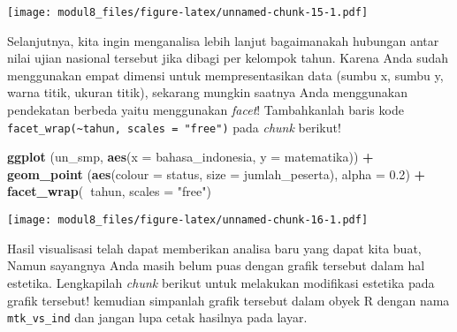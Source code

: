 \documentclass[
]{article}
\newenvironment{Shaded}{\begin{snugshade}}{\end{snugshade}}
\newcommand{\DataTypeTok}[1]{\textcolor[rgb]{0.13,0.29,0.53}{#1}}
\newcommand{\FloatTok}[1]{\textcolor[rgb]{0.00,0.00,0.81}{#1}}
\newcommand{\KeywordTok}[1]{\textcolor[rgb]{0.13,0.29,0.53}{\textbf{#1}}}
\newcommand{\NormalTok}[1]{#1}
\newcommand{\OperatorTok}[1]{\textcolor[rgb]{0.81,0.36,0.00}{\textbf{#1}}}
\newcommand{\StringTok}[1]{\textcolor[rgb]{0.31,0.60,0.02}{#1}}
\begin{document}
\texttt{[image: modul8\_files/figure-latex/unnamed-chunk-15-1.pdf]}

Selanjutnya, kita ingin menganalisa lebih lanjut bagaimanakah hubungan
antar nilai ujian nasional tersebut jika dibagi per kelompok tahun.
Karena Anda sudah menggunakan empat dimensi untuk mempresentasikan data
(sumbu x, sumbu y, warna titik, ukuran titik), sekarang mungkin saatnya
Anda menggunakan pendekatan berbeda yaitu menggunakan \emph{facet}!
Tambahkanlah baris kode
\texttt{facet\_wrap(\textasciitilde{}tahun,\ scales\ =\ "free")} pada
\emph{chunk} berikut!

\begin{Shaded}
\begin{Highlighting}[]
\KeywordTok{ggplot}\NormalTok{ (un_smp, }\KeywordTok{aes}\NormalTok{(}\DataTypeTok{x =}\NormalTok{ bahasa_indonesia, }\DataTypeTok{y =}\NormalTok{ matematika)) }\OperatorTok{+}
\KeywordTok{geom_point}\NormalTok{ (}\KeywordTok{aes}\NormalTok{(}\DataTypeTok{colour =}\NormalTok{ status, }\DataTypeTok{size =}\NormalTok{ jumlah_peserta), }\DataTypeTok{alpha =} \FloatTok{0.2}\NormalTok{) }\OperatorTok{+}
\KeywordTok{facet_wrap}\NormalTok{(}\OperatorTok{~}\NormalTok{tahun, }\DataTypeTok{scales =} \StringTok{"free"}\NormalTok{)}
\end{Highlighting}
\end{Shaded}

\texttt{[image: modul8\_files/figure-latex/unnamed-chunk-16-1.pdf]}

Hasil visualisasi telah dapat memberikan analisa baru yang dapat kita
buat, Namun sayangnya Anda masih belum puas dengan grafik tersebut dalam
hal estetika. Lengkapilah \emph{chunk} berikut untuk melakukan
modifikasi estetika pada grafik tersebut! kemudian simpanlah grafik
tersebut dalam obyek R dengan nama \texttt{mtk\_vs\_ind} dan jangan lupa
cetak hasilnya pada layar.
\end{document}
